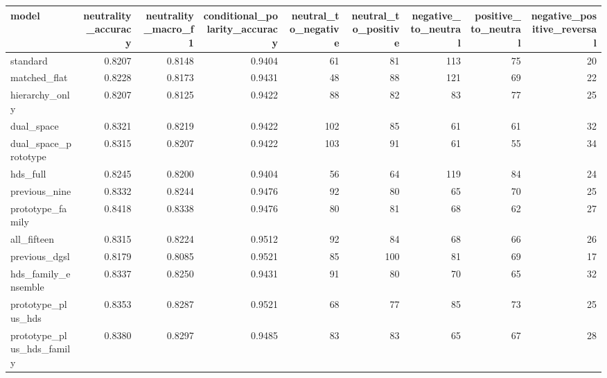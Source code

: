 \begin{tabular}{lrrrrrrrr}
\toprule
model & neutrality\_accuracy & neutrality\_macro\_f1 & conditional\_polarity\_accuracy & neutral\_to\_negative & neutral\_to\_positive & negative\_to\_neutral & positive\_to\_neutral & negative\_positive\_reversal \\
\midrule
standard & 0.8207 & 0.8148 & 0.9404 & 61 & 81 & 113 & 75 & 20 \\
matched\_flat & 0.8228 & 0.8173 & 0.9431 & 48 & 88 & 121 & 69 & 22 \\
hierarchy\_only & 0.8207 & 0.8125 & 0.9422 & 88 & 82 & 83 & 77 & 25 \\
dual\_space & 0.8321 & 0.8219 & 0.9422 & 102 & 85 & 61 & 61 & 32 \\
dual\_space\_prototype & 0.8315 & 0.8207 & 0.9422 & 103 & 91 & 61 & 55 & 34 \\
hds\_full & 0.8245 & 0.8200 & 0.9404 & 56 & 64 & 119 & 84 & 24 \\
previous\_nine & 0.8332 & 0.8244 & 0.9476 & 92 & 80 & 65 & 70 & 25 \\
prototype\_family & 0.8418 & 0.8338 & 0.9476 & 80 & 81 & 68 & 62 & 27 \\
all\_fifteen & 0.8315 & 0.8224 & 0.9512 & 92 & 84 & 68 & 66 & 26 \\
previous\_dgsl & 0.8179 & 0.8085 & 0.9521 & 85 & 100 & 81 & 69 & 17 \\
hds\_family\_ensemble & 0.8337 & 0.8250 & 0.9431 & 91 & 80 & 70 & 65 & 32 \\
prototype\_plus\_hds & 0.8353 & 0.8287 & 0.9521 & 68 & 77 & 85 & 73 & 25 \\
prototype\_plus\_hds\_family & 0.8380 & 0.8297 & 0.9485 & 83 & 83 & 65 & 67 & 28 \\
\bottomrule
\end{tabular}
